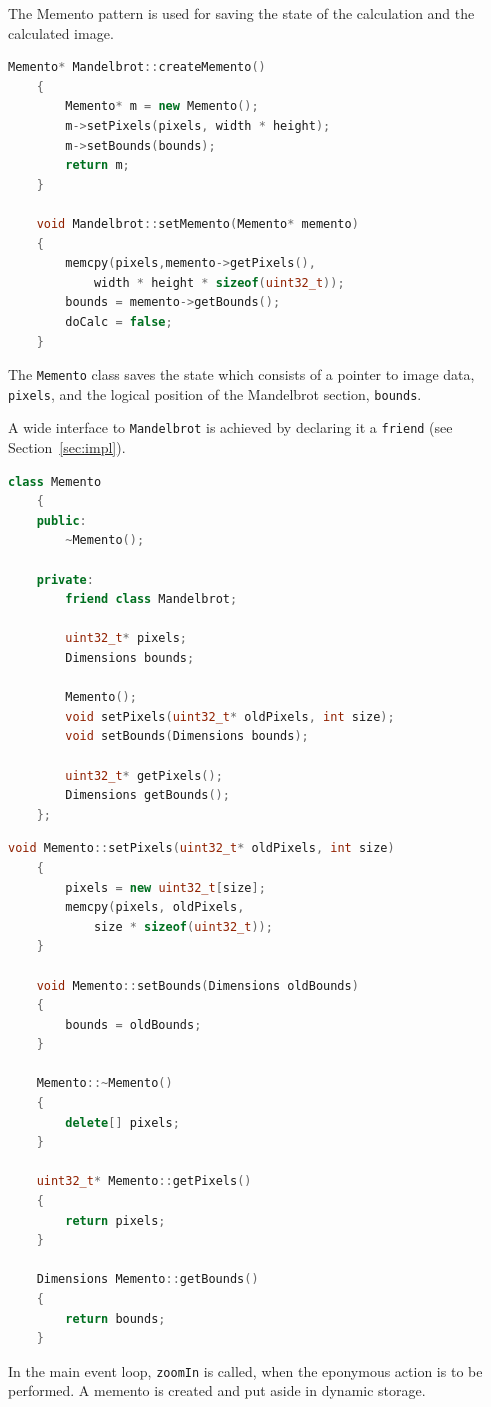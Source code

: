 \documentclass[11pt, a4paper, twoside]{article}
\begin{document}
	The Memento pattern is used for saving the state of the calculation and the calculated image.
	
	\begin{lstlisting}[language=c++, caption={Mandelbrot.cpp}]
	Memento* Mandelbrot::createMemento()
	{
		Memento* m = new Memento();
		m->setPixels(pixels, width * height);
		m->setBounds(bounds);
		return m;
	}
	
	void Mandelbrot::setMemento(Memento* memento)
	{
		memcpy(pixels,memento->getPixels(),
			width * height * sizeof(uint32_t));
		bounds = memento->getBounds();
		doCalc = false;
	}
	\end{lstlisting}
	
	The \verb|Memento| class saves the state which consists of a pointer to image data, \verb|pixels|, and the logical position of the Mandelbrot section, \verb|bounds|.
	
	A wide interface to \verb|Mandelbrot| is achieved by declaring it a \verb|friend| (see Section~\ref{sec:impl}).
	
	\begin{lstlisting}[language=c++, caption={Memento.h}]
	class Memento
	{
	public:
		~Memento();
		
	private:
		friend class Mandelbrot;
		
		uint32_t* pixels;
		Dimensions bounds;
		
		Memento();
		void setPixels(uint32_t* oldPixels, int size);
		void setBounds(Dimensions bounds);
		
		uint32_t* getPixels();
		Dimensions getBounds();
	};
	\end{lstlisting}
	
	\begin{lstlisting}[language=c++, caption={Memento.cpp}]
	void Memento::setPixels(uint32_t* oldPixels, int size)
	{
		pixels = new uint32_t[size];
		memcpy(pixels, oldPixels,
			size * sizeof(uint32_t));
	}
	
	void Memento::setBounds(Dimensions oldBounds)
	{
		bounds = oldBounds;
	}
	
	Memento::~Memento()
	{
		delete[] pixels;
	}
	
	uint32_t* Memento::getPixels()
	{
		return pixels;
	}
	
	Dimensions Memento::getBounds()
	{
		return bounds;
	}
	\end{lstlisting}
	
	In the main event loop, \verb|zoomIn| is called, when the eponymous action is to be performed. A memento is created and put aside in dynamic storage.
	
\end{document}
